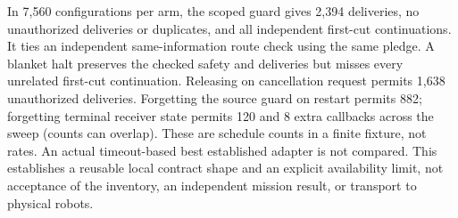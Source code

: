 \documentclass{article}
\begin{document}
In 7,560 configurations per arm, the scoped guard gives 2,394 deliveries,
no unauthorized deliveries or duplicates, and all independent first-cut
continuations. It ties an independent same-information route check using
the same pledge. A blanket halt preserves the checked safety and deliveries
but misses every unrelated first-cut continuation. Releasing on cancellation
request permits 1,638 unauthorized deliveries. Forgetting the source guard
on restart permits 882; forgetting terminal receiver state permits 120 and
8 extra callbacks across the sweep (counts can overlap). These are schedule
counts in a finite fixture, not rates. An actual timeout-based best
established adapter is not compared. This establishes a reusable local
contract shape and an explicit availability limit, not acceptance of the
inventory, an independent mission result, or transport to physical robots.
\end{document}
